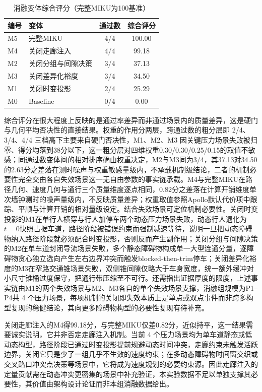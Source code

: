 \documentclass[a4paper,zihao=5]{ctexart}
\theoremstyle{definition}
\begin{document}
\begin{table}[htbp]
\centering
\caption{消融变体综合评分（完整MIKU为100基准）}
\label{tab:exp_ablation_score}
\small
\begin{tabular}{llcc}
\toprule
\textbf{编号} & \textbf{变体} & \textbf{通过数} & \textbf{综合评分} \\
\midrule
M5 & 完整MIKU             & 4/4 & 100.00 \\
M4 & 关闭走廊注入         & 4/4 & 99.18 \\
M2 & 关闭分组与间隙决策   & 3/4 & 37.13 \\
M3 & 关闭差异化裕度       & 3/4 & 34.50 \\
M1 & 关闭时变投影         & 2/4 & 25.29 \\
M0 & Baseline             & 0/4 & 0.00 \\
\bottomrule
\end{tabular}
\end{table}

综合评分在很大程度上反映的是通过率差异而非通过场景内的质量差异，这是硬门与几何平均否决性的直接结果。权重的作用分两层，跨通过数的粗分层即 2/4、3/4、4/4 三档高下主要来自硬门否决性，M1、M2、M3 因关键压力场景失败被归零、得分均落到38分以下，这一粗分层对四维权重0.30/0.30/0.25/0.15的取值不敏感；同通过数变体间的相对排序确由权重决定，M2与M3同为3/4，其37.13对34.50的2.63分之差落在测时噪声与权重敏感量级内，不承载机制级结论，二者的机制必要性完全交由各自失效场景这一无自由参数的事实链承载。M4与完整MIKU在路径几何、速度几何与通行三个质量维度逐点相同，0.82分之差落在计算开销维度单次墙钟测时的噪声量级内，不反映质量差异；权重取值参照Apollo默认代价项中跟踪、平顺与计算开销的相对量级设定。结合失效场景可定位机制必要性。关闭时变投影的M1在单行人横穿与行人加停车两个动态压力场景失败，动态行人退化为$t=0$快照占据车道，路径阶段被错误约束而强制减速等待，说明一旦把动态障碍物纳入路径阶段就必须配合时变投影，否则反而产生副作用；关闭分组与间隙决策的M2在单车道封闭导流场景失败，多个静态障碍物构成单一大型连通分量，逐障碍物贪心独立选向产生左右边界冲突而触发blocked-then-trim停车；关闭差异化裕度的M3在窄路交通锥场景失败，双侧锥间隙仅略大于车身宽度，统一额外缓冲对小尺寸锥桶过度保守，把通行带压缩至不可行。还需指出证据厚度的限度，上述事实链由M1的两个失效场景与M2、M3各自的单个失效场景支撑，消融组规模为P1--P4共 4 个压力场景，每项机制的关闭即失效本质上是单点或双点事件而非跨多构型复现的稳健结论，其向更多障碍物构型的必要性复现有待补充。

关闭走廊注入的M4得99.18分，与完整MIKU仅差0.82分，近似持平，这一结果需要诚实说明，它并非否定走廊注入机制。当前 4 个压力场景均为单车道静态或低动态构型，路径阶段已通过时变投影提前规避动态时间冲突，走廊约束未触发活跃边界，关闭它只是少了一组几乎不生效的速度约束；在多动态障碍物时间窗交织或交叉路口冲突点决策等场景中，它将成为速度规划的必要约束源。因此走廊注入的定量贡献需在动态冲突更密集的场景中补充验证，本实验数据不足以单独支撑其必要性，其价值由架构设计论证而非本组消融数据给出。
\end{document}
